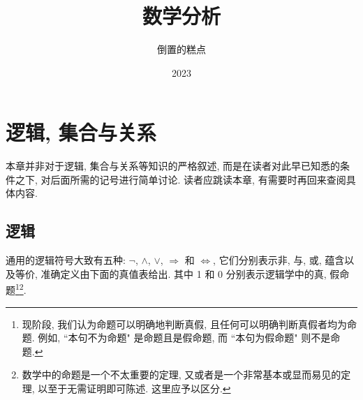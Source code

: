 \documentclass{ctexbook}
\title{数学分析}
\author{倒置的糕点}
\date{2023}
\theoremstyle{definition}
\theoremstyle{remark}
\begin{document}
\frontmatter
\maketitle
\tableofcontents

\mainmatter

\chapter{逻辑, 集合与关系}

本章并非对于逻辑, 集合与关系等知识的严格叙述, 而是在读者对此早已知悉的条件之下, 对后面所需的记号进行简单讨论. 读者应跳读本章, 有需要时再回来查阅具体内容.

\section{逻辑}

通用的逻辑符号大致有五种: $\neg$, $\wedge$, $\vee$, $\Rightarrow$ 和 $\Leftrightarrow$, 它们分别表示非, 与, 或, 蕴含以及等价, 准确定义由下面的真值表给出. 其中 1 和 0 分别表示逻辑学中的真, 假命题\footnote{现阶段, 我们认为命题可以明确地判断真假, 且任何可以明确判断真假者均为命题. 例如, ``本句不为命题" 是命题且是假命题, 而 ``本句为假命题" 则不是命题.}\footnote{数学中的命题是一个不太重要的定理, 又或者是一个非常基本或显而易见的定理, 以至于无需证明即可陈述. 这里应予以区分.}.
\end{document}
